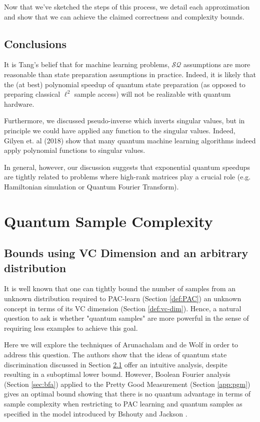 \documentclass[main.tex]{subfiles}
\begin{document}
Now that we've sketched the steps of this process, we detail each approximation and show that we can achieve the claimed correctness and complexity bounds.


\section{Conclusions}

It is Tang's belief that for machine learning problems, $\mathcal{SQ}$ assumptions are more reasonable than state preparation assumptions in practice. Indeed, it is likely that the (at best) polynomial speedup of quantum state preparation (as opposed to preparing classical $\ell^2$ sample access) will not be realizable with quantum hardware.

Furthermore, we discussed pseudo-inverse which inverts singular values, but in principle we could have applied any function to the singular values. Indeed, Gilyen et. al (2018) show that many quantum machine learning algorithms indeed apply polynomial functions to singular values. 

In general, however, our discussion suggests that exponential quantum speedups are tightly related to problems where high-rank matrices play a crucial role (e.g. Hamiltonian simulation or Quantum Fourier Transform).

\chapter{Quantum Sample Complexity}

\section{Bounds using VC Dimension and an arbitrary distribution}

It is well known that one can tightly bound the number of samples from an unknown distribution required to PAC-learn (Section \ref{def:PAC}) an unknown concept in terms of its VC dimension (Section \ref{def:vc-dim}). Hence, a natural question to ask is whether "quantum samples" are more powerful in the sense of requiring less examples to achieve this goal.

Here we will explore the techniques of Arunachalam and de Wolf \cite{arunachalam2016optimal} in order to address this question. The authors show that the ideas of quantum state discrimination discussed in Section \ref{} offer an intuitive analysis, despite resulting in a suboptimal lower bound. However, Boolean Fourier analysis (Section \ref{sec:bfa}) applied to the Pretty Good Measurement (Section \ref{app:pgm}) gives an optimal bound showing that there is no quantum advantage in terms of sample complexity when restricting to PAC learning and quantum samples as specified in the model introduced by Bshouty and Jackson \cite{bshouty1998learning}.
\end{document}
